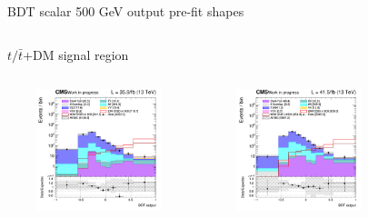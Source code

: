 \documentclass[8pt]{beamer}
\begin{document}
\begin{frame}{BDT scalar 500 GeV output pre-fit shapes}
\begin{columns}
\begin{column}{1.09\textwidth}
\begin{block}{\centering $t/\bar t$+DM signal region}\end{block} \vspace{10pt}
\end{column}
\end{columns} \vspace{-24pt}
\begin{columns}
		\begin{column}{0.33\textwidth}
			\begin{center}
			\begin{block}{}\end{block}	
     			\includegraphics[width=1.0\textwidth, height=100pt]{figs/2016/SmearSR-ttDM-scalar500/log_cratio_ST_topCR_ll_BDT_ttDM500_ST_BDT_output_scalar500_customBinsAttempt7.png}
    		\end{center}		
		\end{column} 
		\begin{column}{0.33\textwidth}
			\begin{center}
			\begin{block}{}\end{block}	
     			\includegraphics[width=1.0\textwidth, height=100pt]{figs/2017/SmearSR-ttDM-scalar500/log_cratio_ST_topCR_ll_BDT_ttDM500_ST_BDT_output_scalar500_customBinsAttempt7.png}
    		\end{center}		
		\end{column} 
		\begin{column}{0.33\textwidth}
			\begin{center}

\end{center}
\end{column}
\end{columns}
\end{frame}
\end{document}
